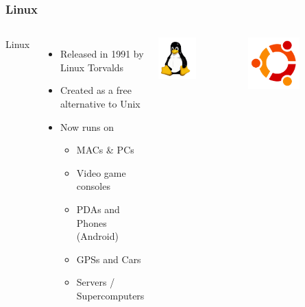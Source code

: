 \documentclass{beamer}
\begin{document}
\begin{frame}
  \frametitle{Linux}
  \begin{columns}
    \begin{LARGE}
      Linux
    \end{LARGE}
    \begin{itemize}
    \item Released in 1991 by Linux Torvalds
    \item Created as a free alternative to Unix
    \item Now runs on
      \begin{itemize}
      \item MACs \& PCs
      \item Video game consoles
      \item PDAs and Phones (Android)
      \item GPSs and Cars
      \item Servers / Supercomputers
      \end{itemize}
    \end{itemize}
      \begin{center}\includegraphics[width=0.5\textwidth]{img/tux}\end{center}
      
      \begin{center}\includegraphics[width=0.5\textwidth]{img/ubuntu}\end{center}
  \end{columns}
\end{frame}
\end{document}
